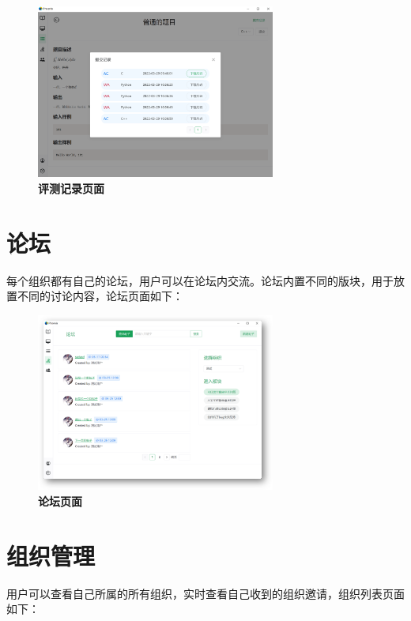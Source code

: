 \begin{figure}[H]
    \centering
    \includegraphics[width=0.7\textwidth]{figure/problem2.png}
    \caption{\textbf{评测记录页面}}
    \label{fig:problem2}
\end{figure}

\section{论坛}

每个组织都有自己的论坛，用户可以在论坛内交流。论坛内置不同的版块，用于放置不同的讨论内容，论坛页面如下：

\begin{figure}[H]
    \centering
    \includegraphics[width=0.7\textwidth]{figure/forum1.png}
    \caption{\textbf{论坛页面}}
    \label{fig:forum1}
\end{figure}

\section{组织管理}

用户可以查看自己所属的所有组织，实时查看自己收到的组织邀请，组织列表页面如下：

